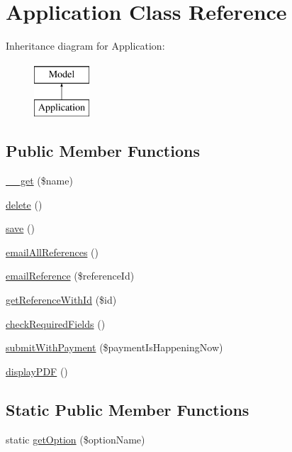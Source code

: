 \hypertarget{class_application}{\section{Application Class Reference}
\label{class_application}
}
Inheritance diagram for Application\-:\begin{figure}[H]
\begin{center}
\leavevmode
\includegraphics[height=2.000000cm]{class_application}
\end{center}
\end{figure}
\subsection*{Public Member Functions}
\begin{DoxyCompactItemize}
\item 
\hyperlink{class_application_aac0113600d0eede18e95837c6479dc52}{\-\_\-\-\_\-get} (\$name)
\item 
\hyperlink{class_application_ac66efae5f31c6341e9f9dccd34966dc1}{delete} ()
\item 
\hyperlink{class_application_ae8567e440a5e51aef75a6dc6a54b9b97}{save} ()
\item 
\hyperlink{class_application_ad59fa82da06c070e40f2f26c408f9e42}{email\-All\-References} ()
\item 
\hyperlink{class_application_a569a6978de2f2715d8199ff9e0050105}{email\-Reference} (\$reference\-Id)
\item 
\hyperlink{class_application_a4cd7a9a3315e138bd62e68922859fef1}{get\-Reference\-With\-Id} (\$id)
\item 
\hyperlink{class_application_ae5b85fc368a244f9c80f5a35a980ed67}{check\-Required\-Fields} ()
\item 
\hyperlink{class_application_a874fe31156d07cd79f583fc04a13a3ab}{submit\-With\-Payment} (\$payment\-Is\-Happening\-Now)
\item 
\hyperlink{class_application_ad438a0a139c3fc28a12d378a396450ca}{display\-P\-D\-F} ()
\end{DoxyCompactItemize}
\subsection*{Static Public Member Functions}
\begin{DoxyCompactItemize}
\item 
static \hyperlink{class_application_aa227284e8bd888e66f3430bf329b1627}{get\-Option} (\$option\-Name)
\end{DoxyCompactItemize}
